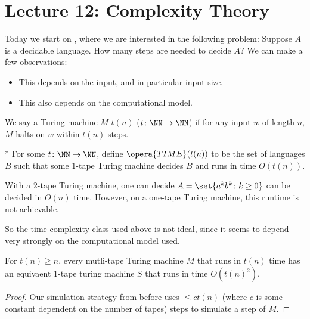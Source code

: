 \section*{Lecture 12: Complexity Theory}
\setcounter{section}{12}

Today we start on , where we are interested in the following problem: Suppose $A$ is a decidable language. How many steps are needed to decide $A$?
We can make a few observations:
\begin{itemize}
	\item This depends on the input, and in particular input size.
	\item This also depends on the computational model.
\end{itemize}

\begin{defn}
	We say a Turing machine $M$  $t(n)$ ($t\colon \NN \to \NN$) if for any input $w$ of length $n$, $M$ halts on $w$ within $t(n)$ steps.
\end{defn}

\begin{defn}*
	For some $t\colon \NN \to \NN$, define $\opera{TIME}(t(n))$ to be the set of languages $B$ such that some $1$-tape Turing machine decides $B$ and runs in time $O(t(n))$.
\end{defn}

\begin{fact}
	With a 2-tape Turing machine, one can decide $A = \set{a^kb^k\colon k\geq 0}$ can be decided in $O(n)$ time. However, on a one-tape Turing machine, this runtime is not achievable.
\end{fact}

So the time complexity class used above is not ideal, since it seems to depend very strongly on the computational model used.

\begin{thm}
	For $t(n) \geq n$, every mutli-tape Turing machine $M$ that runs in $t(n)$ time has an equivaent $1$-tape turing machine $S$ that runs in time $O(t(n)^2)$. 
\end{thm}

\begin{proof}
	Our simulation strategy from before uses $\leq ct(n)$ (where $c$ is some constant dependent on the number of tapes) steps to simulate a step of $M$.
\end{proof}

